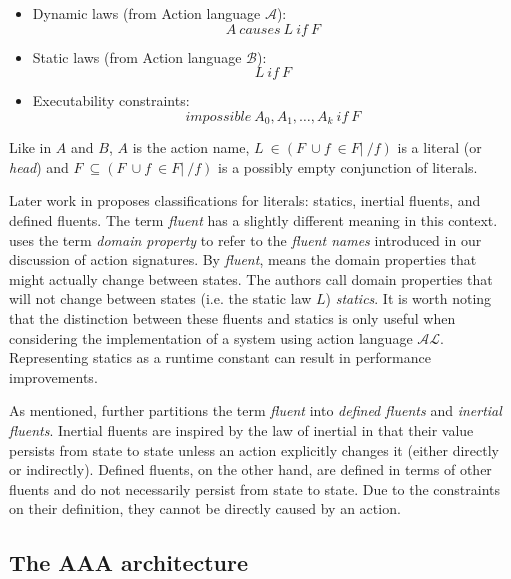 \begin{itemize}
    \item Dynamic laws (from Action language $ \mathcal{A} $):
        $$
        A\ causes\ L\ if\ F
        $$

    \item Static laws (from Action language $ \mathcal{B} $):
        $$
        L\ if\ F
        $$

    \item Executability constraints:
        $$
        impossible\ A_0, A_1, \dots, A_k\ if\ F
        $$
\end{itemize}

Like in $A$ and $B$, $A$ is the action name, $L\ \in(F\ \cup{f\ \in F|\ /f}) $ is a literal (or \textit{head}) and $F\ \subseteq(F\ \cup{f\ \in F|\ /f})$ is a possibly empty conjunction of literals.

Later work in \cite{gelfond_knowledge_2014} proposes classifications for literals: statics, inertial fluents, and defined fluents.
The term \textit{fluent} has a slightly different meaning in this context.
\cite{gelfond_knowledge_2014} uses the term \textit{domain property} to refer to the \textit{fluent names} introduced in our discussion of action signatures.
By \textit{fluent}, \cite{gelfond_knowledge_2014} means the domain properties that might actually change between states.
The authors call domain properties that will not change between states (i.e. the static law $L$) \textit{statics}.
It is worth noting that the distinction between these fluents and statics is only useful when considering the implementation of a system using action language $\mathcal{AL}$.
Representing statics as a runtime constant can result in performance improvements.

As mentioned, \cite{gelfond_knowledge_2014} further partitions the term \textit{fluent} into \textit{defined fluents} and \textit{inertial fluents}.
Inertial fluents are inspired by the law of inertial in that their value persists from state to state unless an action explicitly changes it (either directly or indirectly).
Defined fluents, on the other hand, are defined in terms of other fluents and do not necessarily persist from state to state.
Due to the constraints on their definition, they cannot be directly caused by an action.


\subsection{The AAA architecture}
\label{subsec:aaa_architecture}


